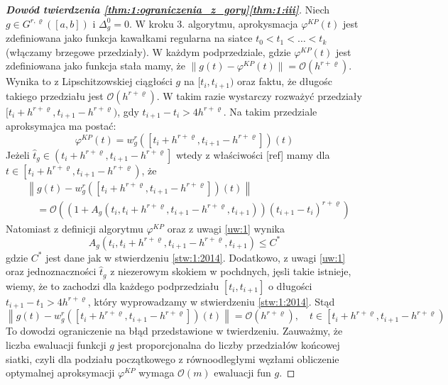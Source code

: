 \documentclass[oik, pdftex, robocza, man]{mgrwms}
\begin{document}
    \begin{proof}[\textbf{Dowód twierdzenia \ref{thm:1:ograniczenia_z_gory}\ref{thm:1:iii}}]
        Niech $g \in G^{r, \varrho}([a,b])$ i $\Delta_{g}^{0} = 0$. W kroku 3. algorytmu, aprokysmacja $\varphi^{KP}(t)$ jest zdefiniowana jako funkcja kawałkami regularna na siatce $t_{0} < t_{1} < \ldots < t_{k}$ (włączamy brzegowe przedziały). W każdym podprzedziale, gdzie $\varphi^{KP}(t)$ jest zdefiniowana jako funkcja stała mamy, że $\|g(t) - \varphi^{KP}(t)\| = \mathcal{O}(h^{r+\varrho})$. Wynika to z Lipschitzowskiej ciągłości $g$ na $[t_{i}, t_{i+1})$ oraz faktu, że długośc takiego przedziału jest $\mathcal{O}(h^{r+\varrho})$.
        W takim razie wystarczy rozważyć przedziały $[t_{i} + h^{r+\varrho}, t_{i+1} - h^{r+\varrho})$, gdy $t_{i+1}-t_{i} > 4h^{r+\varrho}$. Na takim przedziale aproksymajca ma postać:
        \begin{equation*}
            \varphi^{KP}(t)=w_{g}^{r}\left(\left[t_{i}+h^{r+\varrho}, t_{i+1}-h^{r+\varrho}\right]\right)(t)            
        \end{equation*}
        Jeżeli $\hat{t}_{g} \in\left(t_{i}+h^{r+\varrho}, t_{i+1}-h^{r+\varrho}\right]$ wtedy z właściwości [ref] mamy dla $t \in\left[t_{i}+h^{r+\varrho}, t_{i+1}-h^{r+\varrho}\right)$, że
        \begin{equation*}
            \begin{aligned}
                &\left\|g(t)-w_{g}^{r}\left(\left[t_{i}+h^{r+\varrho}, t_{i+1}-h^{r+\varrho}\right]\right)(t)\right\| \\
                &\quad=\mathcal{O}\left(\left(1+A_{g}\left(t_{i}, t_{i}+h^{r+\varrho}, t_{i+1}-h^{r+\varrho}, t_{i+1}\right)\right)\left(t_{i+1}-t_{i}\right)^{r+\varrho}\right)
            \end{aligned}                            
        \end{equation*}
        Natomiast z definicji algorytmu $\varphi^{KP}$ oraz z uwagi \ref{uw:1} wynika
        \begin{equation*}
            A_{g}\left(t_{i}, t_{i}+h^{r+\varrho}, t_{i+1}-h^{r+\varrho}, t_{i+1}\right) \leq C^{*}
        \end{equation*}
        gdzie $C^{*}$ jest dane jak w stwierdzeniu \ref{stw:1:2014}. Dodatkowo, z uwagi \ref{uw:1} oraz jednoznaczności $\hat{t}_{g}$ z niezerowym skokiem w pochdnych, jęsli takie istnieje, wiemy, że to zachodzi dla każdego podprzedziału $[t_{i}, t_{i+1}]$ o długości $t_{i+1} - t_{1} > 4h^{r+\varrho}$, który wyprowadzamy w stwierdzeniu \ref{stw:1:2014}.
        Stąd
        \begin{equation*}
            \left\|g(t)-w_{g}^{r}\left(\left[t_{i}+h^{r+\varrho}, t_{i+1}-h^{r+\varrho}\right]\right)(t)\right\|=\mathcal{O}\left(h^{r+\varrho}\right), \quad t \in\left[t_{i}+h^{r+\varrho}, t_{i+1}-h^{r+\varrho}\right)
        \end{equation*}
        To dowodzi ograniczenie na błąd przedstawione w twierdzeniu. Zauważmy, że liczba ewaluacji funkcji $g$ jest proporcjonalna do liczby przedziałów końcowej siatki, czyli dla podziału początkowego z równoodległymi węzłami obliczenie optymalnej aproksymacji $\varphi^{KP}$ wymaga $\mathcal{O}(m)$ ewaluacji fun $g$.


\end{proof}
\end{document}

